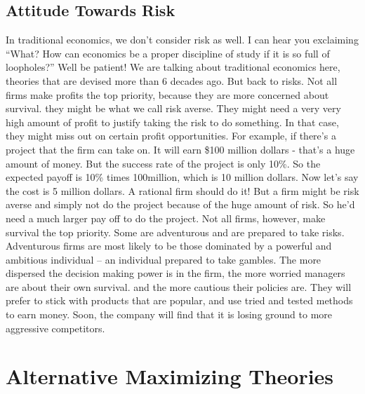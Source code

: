 \documentclass[DIV=classic,11pt,numbers=noenddot,listof=totoc,bibliography=totoc,parskip]{scrartcl}
\begin{document}
\subsection{Attitude Towards Risk}
 In traditional economics, we don’t consider risk as well. I can hear you exclaiming “What? How can economics be a proper discipline of study if it is so full of loopholes?” Well be patient! We are talking about traditional economics here, theories that are devised more than 6 decades ago. But back to risks. Not all firms make profits the top priority, because they are more concerned about survival. they might be what we call risk averse. They might need a very very high amount of profit to justify taking the risk to do something. In that case, they might miss out on certain profit opportunities. For example, if there’s a project that the firm can take on. It will earn \$100 million dollars - that’s a huge amount of money. But the success rate of the project is only 10\%. So the expected payoff is 10\% times 100million, which is 10 million dollars. Now let’s say the cost is 5 million dollars. A rational firm should do it! But a firm might be risk averse and simply not do the project because of the huge amount of risk. So he’d need a much larger pay off to do the project. Not all firms, however, make survival the top priority. Some are adventurous and are prepared to take risks. Adventurous firms are most likely to be those dominated by a powerful and ambitious individual – an individual prepared to take gambles. The more dispersed the decision making power is in the firm, the more worried managers are about their own survival. and the more cautious their policies are. They will prefer to stick with products that are popular, and use tried and tested methods to earn money. Soon, the company will find that it is losing ground to more aggressive competitors.
\newpage
\section{Alternative Maximizing Theories}
\end{document}
